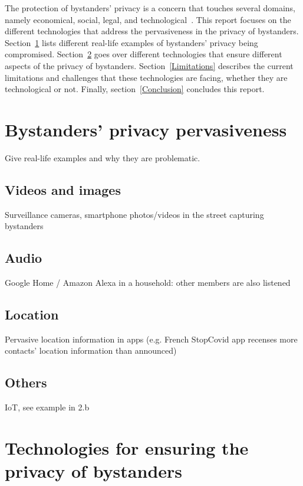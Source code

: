 \documentclass[conference]{IEEEtran}
\begin{document}


The protection of bystanders' privacy is a concern that touches several domains, namely economical, social, legal, and technological~\cite{lu2017privacy}. This report focuses on the different technologies that address the pervasiveness in the privacy of bystanders. Section~\ref{BystandersPrivacy} lists different real-life examples of bystanders' privacy being compromised. Section~\ref{Technologies} goes over different technologies that ensure different aspects of the privacy of bystanders. Section~\ref{Limitations} describes the current limitations and challenges that these technologies are facing, whether they are technological or not. Finally, section~\ref{Conclusion} concludes this report.

\section{Bystanders’ privacy pervasiveness}\label{BystandersPrivacy}
Give real-life examples and why they are problematic.
\subsection{Videos and images}
Surveillance cameras, smartphone photos/videos in the street capturing bystanders
\subsection{Audio}
Google Home / Amazon Alexa in a household: other members are also listened
\subsection{Location}
Pervasive location information in apps (e.g. French StopCovid app recenses more contacts’ location information than announced)
\subsection{Others}
IoT, see example in 2.b

\section{Technologies for ensuring the privacy of bystanders}\label{Technologies}
\end{document}
